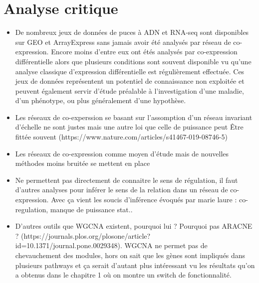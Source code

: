 \section{Analyse critique}
\begin{itemize}
    \item De nombreux jeux de données de puces à ADN et RNA-seq sont disponibles sur GEO et ArrayExpress sans jamais avoir été analysés par réseau de co-expression. Encore moins d'entre eux ont étés analysés par co-expression différentielle alors que plusieurs conditions sont souvent disponible vu qu'une analyse classique d'expression différentielle est régulièrement effectuée. Ces jeux de données représentent un potentiel de connaissance non exploitée et peuvent également servir d'étude préalable à l'investigation d'une maladie, d'un phénotype, ou plus généralement d'une hypothèse. %
    \item Les réseaux de co-experssion se basant sur l'assomption d'un réseau invariant d'échelle ne sont justes mais une autre loi que celle de puissance peut Être fittée souvent (https://www.nature.com/articles/s41467-019-08746-5)
    \item Les réseaux de co-expression comme moyen d'étude mais de nouvelles méthodes moins bruitée se mettent en place %
    \item Ne permettent pas directement de connaitre le sens de régulation, il faut d'autres analyses pour inférer le sens de la relation dans un réseau de co-expression. Avec ça vient les soucis d'inférence évoqués par marie laure : co-regulation, manque de puissance stat..
    \item D'autres outils que WGCNA existent, pourquoi lui ? Pourquoi pas ARACNE ? (https://journals.plos.org/plosone/article?id=10.1371/journal.pone.0029348). WGCNA ne permet pas de chevauchement des modules, hors on sait que les gènes sont impliqués dans plusieurs pathways et ça serait d'autant plus intéressant vu les résultats qu'on a obtenus dans le chapitre 1 où on montre un switch de fonctionnalité.
\end{itemize}



